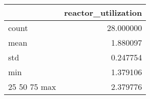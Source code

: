 \begin{tabular}{lr}
\toprule
 & reactor\_utilization \\
\midrule
count & 28.000000 \\
mean & 1.880097 \\
std & 0.247754 \\
min & 1.379106 \\
25%
50%
75%
max & 2.379776 \\
\bottomrule
\end{tabular}

